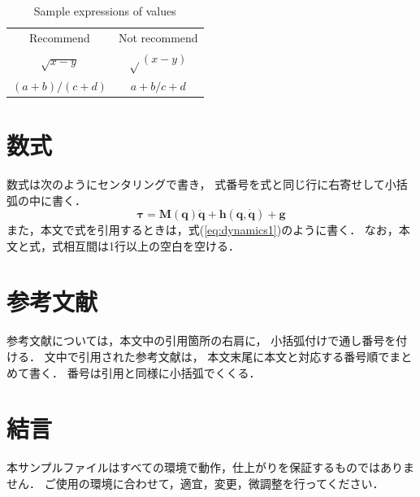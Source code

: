 \documentclass[a4jsme]{jsmepaper}
\begin{document}
\begin{table}[htbp]
  \setcounter{table}{0}
  \begin{center}
  \vspace{1zh}
  \caption{Sample expressions of values}
  \label{tbl:symb}
  \begin{tabular}{c|c}\hline
    Recommend     & Not recommend \\\dhline
    $\sqrt{x-y}$ & $\sqrt{ } (x-y)$ \\\hline
    $(a+b)/(c+d)$ & $a+b/c+d$        \\\hline
  \end{tabular}
  \end{center}
\end{table}

\section{数式}
数式は次のようにセンタリングで書き，
式番号を式と同じ行に右寄せして小括弧の中に書く．
\begin{equation}
   \bm{\tau} = \bm{M}(\bm{q})\ddot{\bm{q}} + \bm{h}(\bm{q},\dot{\bm{q}}) + \bm{g}
\label{eq:dynamics1}
\end{equation}
また，本文で式を引用するときは，式(\ref{eq:dynamics1})のように書く．
なお，本文と式，式相互間は1行以上の空白を空ける．

\section{参考文献}

参考文献については，本文中の引用箇所の右肩に，
小括弧付けで通し番号を付ける\cite{bibsample1,bibsample2,aaaa,bbbb}．
文中で引用された参考文献は，
本文末尾に本文と対応する番号順でまとめて書く．
番号は引用と同様に小括弧でくくる．

\section{結言}
本サンプルファイルはすべての環境で動作，仕上がりを保証するものではありません．
ご使用の環境に合わせて，適宜，変更，微調整を行ってください．
\end{document}
